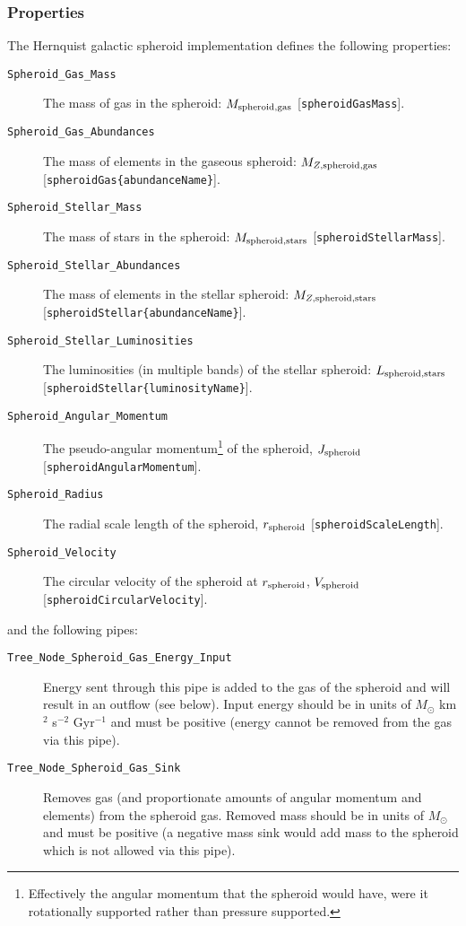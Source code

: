 \subsubsection{Properties}

The Hernquist galactic spheroid implementation defines the following properties:
\begin{description}
 \item [{\tt Spheroid\_Gas\_Mass}] The mass of gas in the spheroid: $M_{\rm spheroid, gas}$ [{\tt spheroidGasMass}].
 \item [{\tt Spheroid\_Gas\_Abundances}] The mass of elements in the gaseous spheroid: $M_{Z, {\rm spheroid, gas}}$ [{\tt spheroidGas\{abundanceName\}}].
 \item [{\tt Spheroid\_Stellar\_Mass}] The mass of stars in the spheroid: $M_{\rm spheroid, stars}$ [{\tt spheroidStellarMass}].
 \item [{\tt Spheroid\_Stellar\_Abundances}] The mass of elements in the stellar spheroid: $M_{Z, {\rm spheroid, stars}}$ [{\tt spheroidStellar\{abundanceName\}}].
 \item [{\tt Spheroid\_Stellar\_Luminosities}] The luminosities (in multiple bands) of the stellar spheroid: $L_{\rm spheroid, stars}$ [{\tt spheroidStellar\{luminosityName\}}].
 \item [{\tt Spheroid\_Angular\_Momentum}] The pseudo-angular momentum\footnote{Effectively the angular momentum that the spheroid would have, were it rotationally supported rather than pressure supported.} of the spheroid, $J_{\rm spheroid}$ [{\tt spheroidAngularMomentum}].
 \item [{\tt Spheroid\_Radius}] The radial scale length of the spheroid, $r_{\rm spheroid}$ [{\tt spheroidScaleLength}].
 \item [{\tt Spheroid\_Velocity}] The circular velocity of the spheroid at $r_{\rm spheroid}$, $V_{\rm spheroid}$ [{\tt spheroidCircularVelocity}].
\end{description}
and the following pipes:
\begin{description}
 \item [{\tt Tree\_Node\_Spheroid\_Gas\_Energy\_Input}] Energy sent through this pipe is added to the gas of the spheroid and will result in an outflow (see below). Input energy should be in units of $M_\odot$ km$^2$ s$^{-2}$ Gyr$^{-1}$ and must be positive (energy cannot be removed from the gas via this pipe).
 \item [{\tt Tree\_Node\_Spheroid\_Gas\_Sink}] Removes gas (and proportionate amounts of angular momentum and elements) from the spheroid gas. Removed mass should be in units of $M_\odot$ and must be positive (a negative mass sink would add mass to the spheroid which is not allowed via this pipe).
\end{description}

